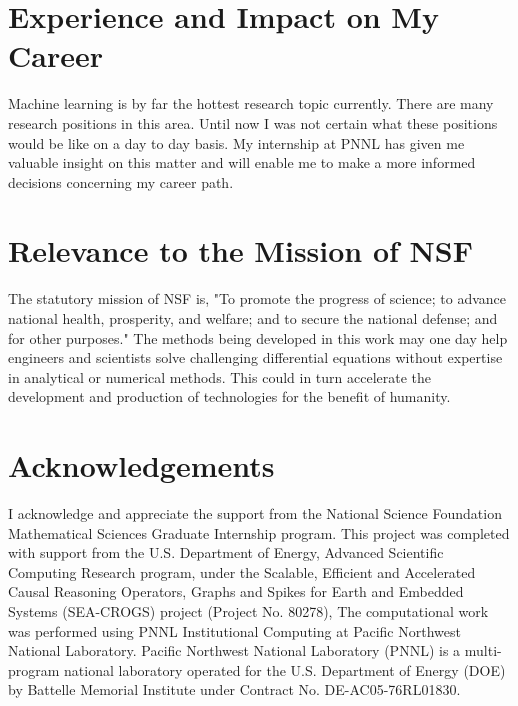 \documentclass[12pt]{article}
\begin{document}
\section{Experience and Impact on My Career}
Machine learning is by far the hottest research topic currently. There are many research positions in this area. Until now I was not certain what these positions would be like on a day to day basis. My internship at PNNL has given me valuable insight on this matter and will enable me to make a more informed decisions concerning my career path.

\section{Relevance to the Mission of NSF}
The statutory mission of NSF is, "To promote the progress of science; to advance national health, prosperity, and welfare; and to secure the national defense; and for other purposes." The methods being developed in this work may one day help engineers and scientists solve challenging differential equations without expertise in analytical or numerical methods. This could in turn accelerate the development and production of technologies for the benefit of humanity.

\section{Acknowledgements}
I acknowledge and appreciate the support from the National Science Foundation Mathematical Sciences Graduate Internship program. This project was completed with support from the U.S. Department of Energy, Advanced Scientific Computing Research program, under the Scalable, Efficient and Accelerated Causal Reasoning Operators, Graphs and Spikes for Earth and Embedded Systems (SEA-CROGS) project (Project No. 80278), The computational work was performed using PNNL Institutional Computing at Pacific Northwest National Laboratory. Pacific Northwest National Laboratory (PNNL) is a multi-program national laboratory operated for the U.S. Department of Energy (DOE) by Battelle Memorial Institute under Contract No. DE-AC05-76RL01830.


\end{document}
